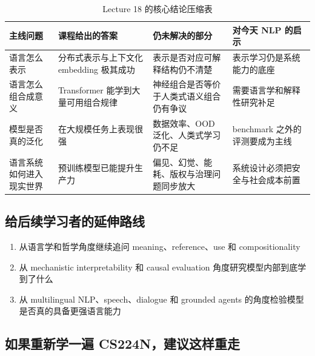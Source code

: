 \begin{table}[H]
\centering
\begin{tabular}{p{} p{} p{} p{}}
\toprule
主线问题 & 课程给出的答案 & 仍未解决的部分 & 对今天 NLP 的启示 \\
\midrule
语言怎么表示 & 分布式表示与上下文化 embedding 极其成功 & 表示是否对应可解释结构仍不清楚 & 表示学习仍是系统能力的底座 \\
语言怎么组合成意义 & Transformer 能学到大量可用组合规律 & 神经组合是否等价于人类式语义组合仍有争议 & 需要语言学和解释性研究补足 \\
模型是否真的泛化 & 在大规模任务上表现很强 & 数据效率、OOD 泛化、人类式学习仍不足 & benchmark 之外的评测要成为主线 \\
语言系统如何进入现实世界 & 预训练模型已能提升生产力 & 偏见、幻觉、能耗、版权与治理问题同步放大 & 系统设计必须把安全与社会成本前置 \\
\bottomrule
\end{tabular}
\caption{Lecture 18 的核心结论压缩表}
\end{table}

\subsection{给后续学习者的延伸路线}

\begin{enumerate}
    \item 从语言学和哲学角度继续追问 meaning、reference、use 和 compositionality
    \item 从 mechanistic interpretability 和 causal evaluation 角度研究模型内部到底学到了什么
    \item 从 multilingual NLP、speech、dialogue 和 grounded agents 的角度检验模型是否真的具备更强语言能力
\end{enumerate}

\subsection{如果重新学一遍 CS224N，建议这样重走}

